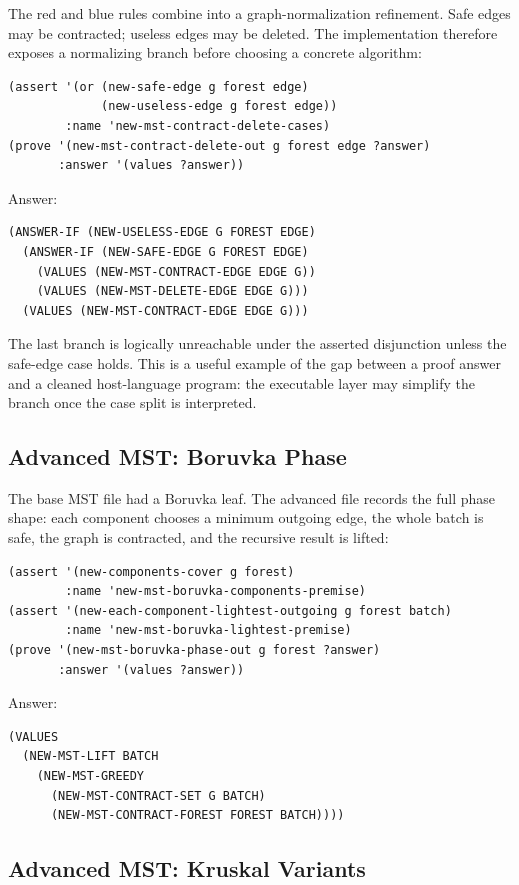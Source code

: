 \documentclass[runningheads]{llncs}
\begin{document}
The red and blue rules combine into a graph-normalization refinement.  Safe
edges may be contracted; useless edges may be deleted.  The implementation
therefore exposes a normalizing branch before choosing a concrete algorithm:
\begin{lstlisting}
(assert '(or (new-safe-edge g forest edge)
             (new-useless-edge g forest edge))
        :name 'new-mst-contract-delete-cases)
(prove '(new-mst-contract-delete-out g forest edge ?answer)
       :answer '(values ?answer))
\end{lstlisting}
Answer:
\begin{lstlisting}
(ANSWER-IF (NEW-USELESS-EDGE G FOREST EDGE)
  (ANSWER-IF (NEW-SAFE-EDGE G FOREST EDGE)
    (VALUES (NEW-MST-CONTRACT-EDGE EDGE G))
    (VALUES (NEW-MST-DELETE-EDGE EDGE G)))
  (VALUES (NEW-MST-CONTRACT-EDGE EDGE G)))
\end{lstlisting}
The last branch is logically unreachable under the asserted disjunction unless
the safe-edge case holds.  This is a useful example of the gap between a proof
answer and a cleaned host-language program: the executable layer may simplify
the branch once the case split is interpreted.

\subsection{Advanced MST: Boruvka Phase}

The base MST file had a Boruvka leaf.  The advanced file records the full phase
shape: each component chooses a minimum outgoing edge, the whole batch is safe,
the graph is contracted, and the recursive result is lifted:
\begin{lstlisting}
(assert '(new-components-cover g forest)
        :name 'new-mst-boruvka-components-premise)
(assert '(new-each-component-lightest-outgoing g forest batch)
        :name 'new-mst-boruvka-lightest-premise)
(prove '(new-mst-boruvka-phase-out g forest ?answer)
       :answer '(values ?answer))
\end{lstlisting}
Answer:
\begin{lstlisting}
(VALUES
  (NEW-MST-LIFT BATCH
    (NEW-MST-GREEDY
      (NEW-MST-CONTRACT-SET G BATCH)
      (NEW-MST-CONTRACT-FOREST FOREST BATCH))))
\end{lstlisting}

\subsection{Advanced MST: Kruskal Variants}
\end{document}
